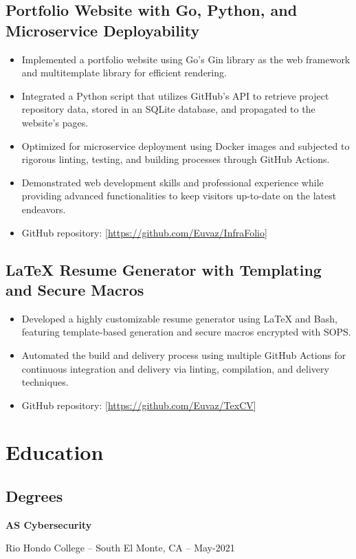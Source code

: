 \documentclass[a4paper]{article}
\begin{document}
\subsection{Portfolio Website with Go, Python, and Microservice Deployability}
\begin{itemize}
    \item Implemented a portfolio website using Go's Gin library as the web framework and multitemplate library for efficient rendering.
    \item Integrated a Python script that utilizes GitHub's API to retrieve project repository data, stored in an SQLite database, and propagated to the website's pages.
    \item Optimized for microservice deployment using Docker images and subjected to rigorous linting, testing, and building processes through GitHub Actions.
    \item Demonstrated web development skills and professional experience while providing advanced functionalities to keep visitors up-to-date on the latest endeavors.
    \item GitHub repository: [\url{https://github.com/Euvaz/InfraFolio}]
\end{itemize}

\subsection{LaTeX Resume Generator with Templating and Secure Macros}
\begin{itemize}
    \item Developed a highly customizable resume generator using LaTeX and Bash, featuring template-based generation and secure macros encrypted with SOPS\@.
    \item Automated the build and delivery process using multiple GitHub Actions for continuous integration and delivery via linting, compilation, and delivery techniques.
    \item GitHub repository: [\url{https://github.com/Euvaz/TexCV}]
\end{itemize}

\section{Education}
\subsection{Degrees}
\begin{minipage}{\textwidth}
\textbf{AS Cybersecurity}\par
Rio Hondo College -- South El Monte, CA -- May-2021
\end{minipage}
\end{document}
